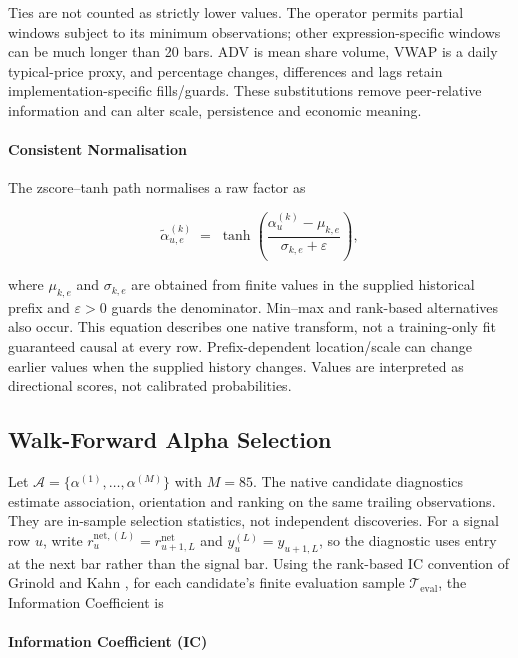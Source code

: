 Ties are not counted as strictly lower values. The operator permits partial windows subject to its minimum observations; other expression-specific windows can be much longer than 20 bars. ADV is mean share volume, VWAP is a daily typical-price proxy, and percentage changes, differences and lags retain implementation-specific fills/guards. These substitutions remove peer-relative information and can alter scale, persistence and economic meaning.

\paragraph{Consistent Normalisation}
The zscore--tanh path normalises a raw factor as

\begin{equation}
    \tilde{\alpha}^{(k)}_{u,e}
    \;=\;
    \tanh\!\left(
        \frac{\alpha^{(k)}_u - \mu_{k,e}}{\sigma_{k,e} + \varepsilon}
    \right),
    \label{eq:alpha_norm}
\end{equation}


where $\mu_{k,e}$ and $\sigma_{k,e}$ are obtained from finite values in the supplied historical prefix and $\varepsilon>0$ guards the denominator. Min--max and rank-based alternatives also occur. This equation describes one native transform, not a training-only fit guaranteed causal at every row. Prefix-dependent location/scale can change earlier values when the supplied history changes. Values are interpreted as directional scores, not calibrated probabilities.

\subsection{Walk-Forward Alpha Selection}
Let $\mathcal{A}=\{\alpha^{(1)},\ldots,\alpha^{(M)}\}$ with $M=85$. The native candidate diagnostics estimate association, orientation and ranking on the same trailing observations. They are in-sample selection statistics, not independent discoveries. For a signal row $u$, write $r^{\mathrm{net},(L)}_u=r^{\mathrm{net}}_{u+1,L}$ and $y^{(L)}_u=y_{u+1,L}$, so the diagnostic uses entry at the next bar rather than the signal bar. Using the rank-based IC convention of Grinold and Kahn \cite{grinold1999active}, for each candidate's finite evaluation sample $\mathcal{T}_{\mathrm{eval}}$, the Information Coefficient is

\paragraph{Information Coefficient (IC)}

